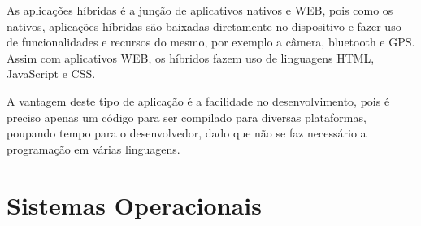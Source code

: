 As  aplicações híbridas é a junção de aplicativos nativos e WEB, pois como os nativos, aplicações híbridas são baixadas diretamente no dispositivo e fazer uso de funcionalidades e recursos do mesmo, por exemplo a câmera, bluetooth e GPS. Assim com aplicativos WEB, os híbridos fazem uso de linguagens HTML, JavaScript e CSS. \cite{tavares2016introduccao}

A vantagem deste tipo de aplicação é a facilidade no desenvolvimento, pois é preciso apenas um código para ser compilado para diversas plataformas, poupando tempo para o  desenvolvedor, dado que não se faz necessário a programação em várias linguagens.







\section{Sistemas Operacionais}

